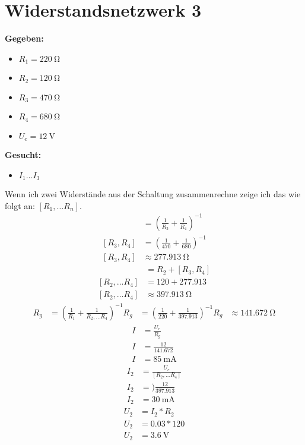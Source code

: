 \documentclass[12pt,a4paper]{amsart}
\begin{document}
\section{Widerstandsnetzwerk 3}
\textbf{Gegeben:}
\begin{itemize}
\item $R_1 = \qty{220}{\ohm}$
\item $R_2 = \qty{120}{\ohm}$
\item $R_3 = \qty{470}{\ohm}$
\item $R_4 = \qty{680}{\ohm}$
\item $U_e = \qty{12}{\volt}$
\end{itemize}
\textbf{Gesucht:}
\begin{itemize}
\item $I_1 \dots I_3$
\end{itemize}
Wenn ich zwei Widerstände aus der Schaltung zusammenrechne zeige ich das wie folgt an: $[R_1, \dots R_n]$.
\begin{align*}
  [R_3, R_4]&=\left(\frac{1}{R_3}+\frac{1}{R_4}\right)^{-1}\\
  [R_3, R_4]&=\left(\frac{1}{470}+\frac{1}{680}\right)^{-1}\\
  [R_3, R_4]&\approx \qty{277.913}{\ohm}
\end{align*}
\begin{align*}
  [R_2, \dots R_4]&=R_2+[R_3, R_4]\\
  [R_2, \dots R_4]&=120+277.913\\
  [R_2, \dots R_4]&\approx \qty{397.913}{\ohm}
\end{align*}
\begin{align*}
  R_g&=\left(\frac{1}{R_1}+\frac{1}{R_2, \dots R_4}\right)^{-1}
  R_g&=\left(\frac{1}{220}+\frac{1}{397.913}\right)^{-1}
  R_g&\approx \qty{141.672}{\ohm}
\end{align*}
\begin{align*}
  I&=\frac{U_e}{R_g}\\
  I&=\frac{12}{141.672}\\
  I&= \qty{85}{\mA}
\end{align*}
\begin{align*}
  I_2&=\frac{U_e}{[R_2, \dots R_4]}\\
  I_2&=)\frac{12}{397.913}\\
  I_2&= \qty{30}{\mA}
\end{align*}
\begin{align*}
  U_2&=I_2*R_2\\
  U_2&=0.03*120\\
  U_2&= \qty{3.6}{\volt}
\end{align*}
\end{document}
